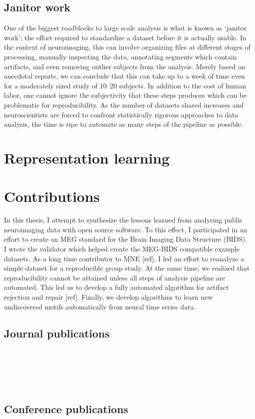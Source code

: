 \subsection{Janitor work}

One of the biggest roadblocks to large scale analysis is what is known as `janitor work': the effort required to standardize a dataset before it is actually usable. In the context of neuroimaging, this can involve organizing files at different stages of processing, manually inspecting the data, annotating segments which contain artifacts, and even removing outlier subjects from the analysis. Merely based on anecdotal reports, we can conclude that this can take up to a week of time even for a moderately sized study of 10--20 subjects.
In addition to the cost of human labor, one cannot ignore the subjectivity that these steps produces which can be problematic for reproducibility. As the number of datasets shared increases and neuroscientists are forced to confront statistically rigorous approaches to data analysis, the time is ripe to automate as many steps of the pipeline as possible.

\section{Representation learning}

\section{Contributions}
In this thesis, I attempt to synthesize the lessons learned from analysing public neuroimaging data with open source software. To this effect, I participated in an effort to create an MEG standard for the Brain Imaging Data Structure (BIDS). I wrote the validator which helped create the MEG-BIDS compatible example datasets. As a long time contributor to MNE [ref], I led an effort to reanalyze a simple dataset for a reproducible group study. At the same time, we realized that reproducibility cannot be attained unless all steps of analysis pipeline are automated. This led us to develop a fully automated algorithm for artifact rejection and repair [ref]. Finally, we develop algorithms to learn new undiscovered motifs automatically from neural time series data. 

\subsection*{Journal publications}
 \\ \\
 \\ \\

\subsection*{Conference publications}
 \\ \\
